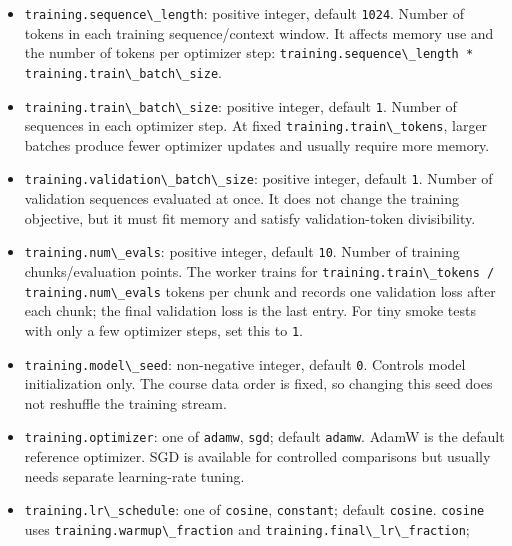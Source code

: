 \documentclass[
]{article}
\newcommand{\passthrough}[1]{#1}
\providecommand{\tightlist}{%
  \setlength{\itemsep}{0pt}\setlength{\parskip}{0pt}}
\begin{document}
\begin{itemize}
\tightlist
\item
  \passthrough{\lstinline!training.sequence\_length!}: positive integer,
  default \passthrough{\lstinline!1024!}. Number of tokens in each
  training sequence/context window. It affects memory use and the number
  of tokens per optimizer step:
  \passthrough{\lstinline!training.sequence\_length * training.train\_batch\_size!}.
\item
  \passthrough{\lstinline!training.train\_batch\_size!}: positive
  integer, default \passthrough{\lstinline!1!}. Number of sequences in
  each optimizer step. At fixed
  \passthrough{\lstinline!training.train\_tokens!}, larger batches
  produce fewer optimizer updates and usually require more memory.
\item
  \passthrough{\lstinline!training.validation\_batch\_size!}: positive
  integer, default \passthrough{\lstinline!1!}. Number of validation
  sequences evaluated at once. It does not change the training
  objective, but it must fit memory and satisfy validation-token
  divisibility.
\item
  \passthrough{\lstinline!training.num\_evals!}: positive integer,
  default \passthrough{\lstinline!10!}. Number of training
  chunks/evaluation points. The worker trains for
  \passthrough{\lstinline!training.train\_tokens / training.num\_evals!}
  tokens per chunk and records one validation loss after each chunk; the
  final validation loss is the last entry. For tiny smoke tests with
  only a few optimizer steps, set this to \passthrough{\lstinline!1!}.
\item
  \passthrough{\lstinline!training.model\_seed!}: non-negative integer,
  default \passthrough{\lstinline!0!}. Controls model initialization
  only. The course data order is fixed, so changing this seed does not
  reshuffle the training stream.
\item
  \passthrough{\lstinline!training.optimizer!}: one of
  \passthrough{\lstinline!adamw!}, \passthrough{\lstinline!sgd!};
  default \passthrough{\lstinline!adamw!}. AdamW is the default
  reference optimizer. SGD is available for controlled comparisons but
  usually needs separate learning-rate tuning.
\item
  \passthrough{\lstinline!training.lr\_schedule!}: one of
  \passthrough{\lstinline!cosine!}, \passthrough{\lstinline!constant!};
  default \passthrough{\lstinline!cosine!}.
  \passthrough{\lstinline!cosine!} uses
  \passthrough{\lstinline!training.warmup\_fraction!} and
  \passthrough{\lstinline!training.final\_lr\_fraction!};

\end{itemize}
\end{document}
